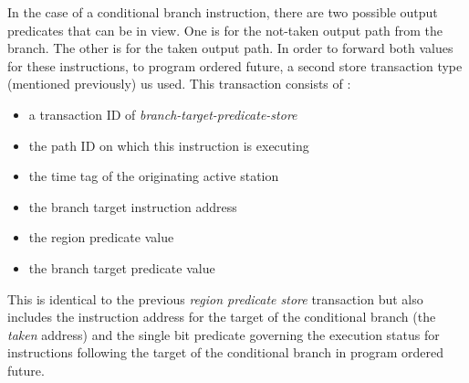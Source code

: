 \documentclass[10pt,dvips]{article}
\begin{document}
In the case of a conditional branch instruction,
there are two possible output predicates that can be in
view.  One is for the not-taken output path from the branch.
The other is for the taken output path.
In order to forward both values for these instructions,
to program ordered future, a second store transaction
type (mentioned previously) us used.
This transaction consists of :
%
\vspace{-0.05in}
\begin{itemize}
\vspace{-0.1in}
\item{a transaction ID of \textit{branch-target-predicate-store}}
\vspace{-0.1in}
\item{the path ID on which this instruction is executing}
\vspace{-0.1in}
\item{the time tag of the originating active station}
\vspace{-0.1in}
\item{the branch target instruction address}
\vspace{-0.1in}
\item{the region predicate value}
\vspace{-0.1in}
\item{the branch target predicate value}
\vspace{-0.1in}
\end{itemize}   
%
This is identical to the previous \textit{region predicate store}
transaction but also includes the instruction address
for the target of the conditional branch (the \textit{taken} address)
and the single bit predicate
governing the execution status for instructions
following the target of the conditional branch in program ordered
future.
\end{document}
